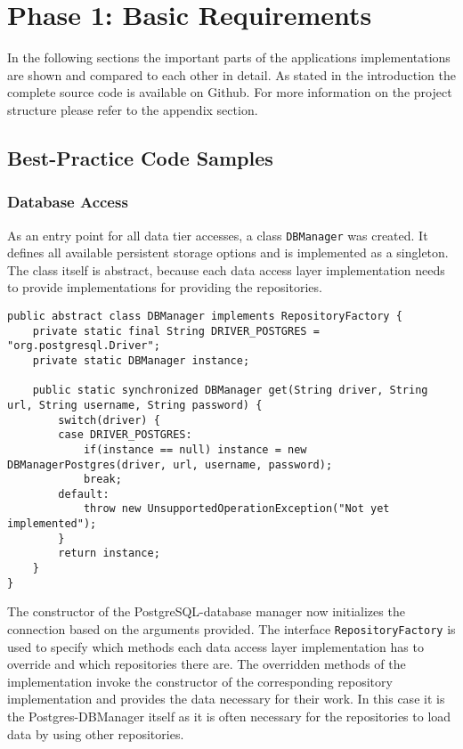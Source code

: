 \clearpage
\section{Phase 1: Basic Requirements}
\label{sec:code-samples}
In the following sections the important parts of the applications implementations are shown and compared to each other in detail. As stated in the introduction the complete source code is available on Github. For more information on the project structure please refer to the appendix section.

\subsection{Best-Practice Code Samples}

\subsubsection{Database Access}
As an entry point for all data tier accesses, a class \texttt{DBManager} was created. It defines all available persistent storage options and is implemented as a singleton. The class itself is abstract, because each data access layer implementation needs to provide implementations for providing the repositories.
\begin{lstlisting}[caption={[DBManager singleton class.]DBManager singleton class. Used for instantiating the implementation of the chosen interface.}, captionpos=b, label={lst:dbmanager}]
public abstract class DBManager implements RepositoryFactory {
	private static final String DRIVER_POSTGRES = "org.postgresql.Driver";
	private static DBManager instance;
	
	public static synchronized DBManager get(String driver, String url, String username, String password) {
		switch(driver) {
		case DRIVER_POSTGRES:
			if(instance == null) instance = new DBManagerPostgres(driver, url, username, password);
			break;
		default:
			throw new UnsupportedOperationException("Not yet implemented");
		}
		return instance;
	}
}
\end{lstlisting}

The constructor of the PostgreSQL-database manager now initializes the connection based on the arguments provided. The interface \texttt{RepositoryFactory} is used to specify which methods each data access layer implementation has to override and which repositories there are. The overridden methods of the implementation invoke the constructor of the corresponding repository implementation and provides the data necessary for their work. In this case it is the Postgres-DBManager itself as it is often necessary for the repositories to load data by using other repositories.

